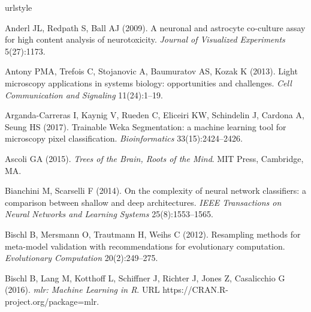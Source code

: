 \begin{thebibliography}{110}
\providecommand{\natexlab}[1]{#1}
\providecommand{\url}[1]{{#1}}
\providecommand{\urlprefix}{URL }
\expandafter\ifx\csname urlstyle\endcsname\relax
  \providecommand{\doi}[1]{DOI~\discretionary{}{}{}#1}\else
  \providecommand{\doi}{DOI~\discretionary{}{}{}\begingroup
  \urlstyle{rm}\Url}\fi
\providecommand{\eprint}[2][]{\url{#2}}

Anderl JL, Redpath S, Ball AJ (2009). A neuronal and astrocyte co-culture assay
  for high content analysis of neurotoxicity. \emph{Journal of Visualized
  Experiments} 5(27):1173.

Antony PMA, Trefois C, Stojanovic A, Baumuratov AS, Kozak K (2013). Light
  microscopy applications in systems biology: opportunities and challenges.
  \emph{Cell Communication and Signaling} 11(24):1--19.

Arganda-Carreras I, Kaynig V, Rueden C, Eliceiri KW, Schindelin J, Cardona A,
  Seung HS (2017). {Trainable Weka Segmentation}: a machine learning tool for
  microscopy pixel classification. \emph{Bioinformatics} 33(15):2424--2426.

Ascoli GA (2015). \emph{Trees of the Brain, Roots of the Mind}. MIT Press,
  Cambridge, MA.

Bianchini M, Scarselli F (2014). On the complexity of neural network
  classifiers: a comparison between shallow and deep architectures. \emph{IEEE
  Transactions on Neural Networks and Learning Systems} 25(8):1553--1565.

Bischl B, Mersmann O, Trautmann H, Weihs C (2012). Resampling methods for
  meta-model validation with recommendations for evolutionary computation.
  \emph{Evolutionary Computation} 20(2):249--275.

Bischl B, Lang M, Kotthoff L, Schiffner J, Richter J, Jones Z, Casalicchio G
  (2016).
\newblock \emph{mlr: Machine Learning in R}.
  \urlprefix\url{https://CRAN.R-project.org/package=mlr}.


\end{thebibliography}
